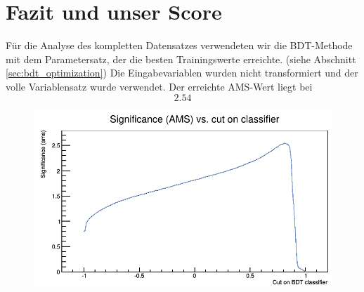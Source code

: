 \section{Fazit und unser Score}
Für die Analyse des kompletten Datensatzes verwendeten wir die BDT-Methode mit dem Parametersatz, der die besten Trainingswerte erreichte. (siehe Abschnitt \ref{sec:bdt_optimization}) Die Eingabevariablen wurden nicht transformiert und der volle Variablensatz wurde verwendet. Der erreichte AMS-Wert liegt bei
\begin{equation}
\boxed{2.54}
\end{equation}

\begin{figure}[htp]
\begin{center}
  \includegraphics[width=0.7\linewidth]{sections/conclusion/AMS_vs_Cut_cropped.png}
 \caption[]{}
\label{fig:bdt_Shrinkage}
\end{center}
\end{figure}